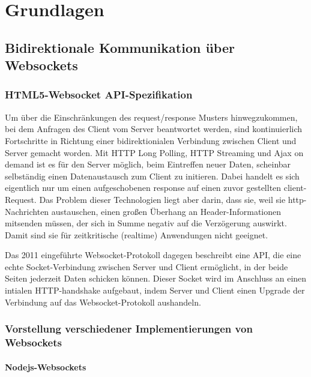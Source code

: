 

\chapter{Grundlagen}\label{s.Grundlagen}

\section{Bidirektionale Kommunikation über Websockets}\label{s.Bidirektionale Kommunikation über Websockets}

\subsection{HTML5-Websocket API-Spezifikation}
Um über die Einschränkungen des request/response Musters hinwegzukommen, bei dem Anfragen des Client vom Server beantwortet werden, sind kontinuierlich Fortschritte in Richtung einer bidirektionialen Verbindung zwischen Client und Server gemacht worden.
Mit HTTP Long Polling, HTTP Streaming und Ajax on demand ist es für den Server möglich, beim Eintreffen neuer Daten, scheinbar selbständig einen Datenaustausch zum Client zu initieren. Dabei handelt es sich eigentlich nur um einen aufgeschobenen response auf einen zuvor gestellten client-Request.
Das Problem dieser Technologien liegt aber darin, dass sie, weil sie http-Nachrichten austauschen, einen großen Überhang an Header-Informationen mitsenden müssen, der sich in Summe negativ auf die Verzögerung auswirkt. Damit sind sie für zeitkritische (realtime) Anwendungen nicht geeignet.

Das 2011 eingeführte Websocket-Protokoll dagegen beschreibt eine API, die eine echte Socket-Verbindung zwischen Server und Client ermöglicht, in der beide Seiten jederzeit Daten schicken können. Dieser Socket wird im Anschluss an einen intialen HTTP-handshake aufgebaut, indem Server und Client  einen Upgrade der Verbindung auf das Websocket-Protokoll aushandeln. 

\subsection{Vorstellung verschiedener Implementierungen von Websockets}

\subsubsection{Nodejs-Websockets}

